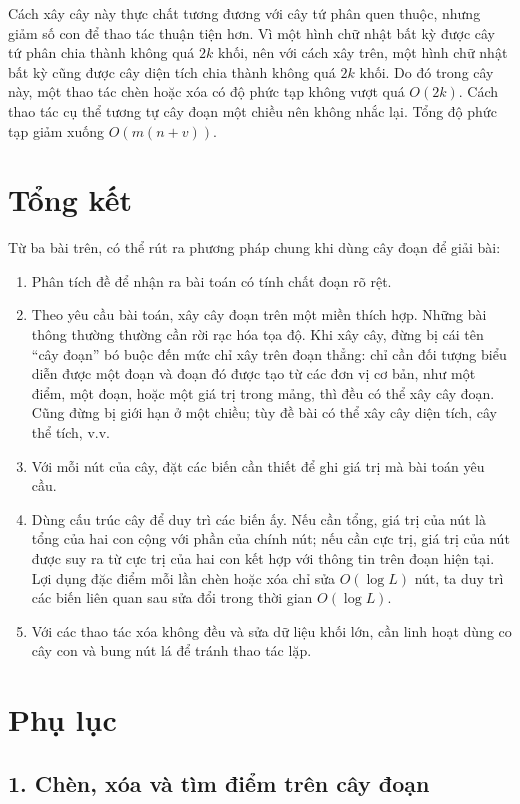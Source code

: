 \documentclass[11pt]{article}
\begin{document}
Cách xây cây này thực chất tương đương với cây tứ phân quen thuộc, nhưng giảm
số con để thao tác thuận tiện hơn. Vì một hình chữ nhật bất kỳ được cây tứ
phân chia thành không quá $2k$ khối, nên với cách xây trên, một hình chữ nhật
bất kỳ cũng được cây diện tích chia thành không quá $2k$ khối. Do đó trong
cây này, một thao tác chèn hoặc xóa có độ phức tạp không vượt quá $O(2k)$.
Cách thao tác cụ thể tương tự cây đoạn một chiều nên không nhắc lại. Tổng độ
phức tạp giảm xuống $O(m(n+v))$.

\section{Tổng kết}

Từ ba bài trên, có thể rút ra phương pháp chung khi dùng cây đoạn để giải bài:
\begin{enumerate}
  \item Phân tích đề để nhận ra bài toán có tính chất đoạn rõ rệt.
  \item Theo yêu cầu bài toán, xây cây đoạn trên một miền thích hợp. Những bài
  thông thường thường cần rời rạc hóa tọa độ. Khi xây cây, đừng bị cái tên
  ``cây đoạn'' bó buộc đến mức chỉ xây trên đoạn thẳng: chỉ cần đối tượng biểu
  diễn được một đoạn và đoạn đó được tạo từ các đơn vị cơ bản, như một điểm,
  một đoạn, hoặc một giá trị trong mảng, thì đều có thể xây cây đoạn. Cũng
  đừng bị giới hạn ở một chiều; tùy đề bài có thể xây cây diện tích, cây thể
  tích, v.v.
  \item Với mỗi nút của cây, đặt các biến cần thiết để ghi giá trị mà bài toán
  yêu cầu.
  \item Dùng cấu trúc cây để duy trì các biến ấy. Nếu cần tổng, giá trị của
  nút là tổng của hai con cộng với phần của chính nút; nếu cần cực trị, giá
  trị của nút được suy ra từ cực trị của hai con kết hợp với thông tin trên
  đoạn hiện tại. Lợi dụng đặc điểm mỗi lần chèn hoặc xóa chỉ sửa
  $O(\log L)$ nút, ta duy trì các biến liên quan sau sửa đổi trong thời gian
  $O(\log L)$.
  \item Với các thao tác xóa không đều và sửa dữ liệu khối lớn, cần linh hoạt
  dùng co cây con và bung nút lá để tránh thao tác lặp.
\end{enumerate}

\section*{Phụ lục}

\subsection*{1. Chèn, xóa và tìm điểm trên cây đoạn}
\end{document}

